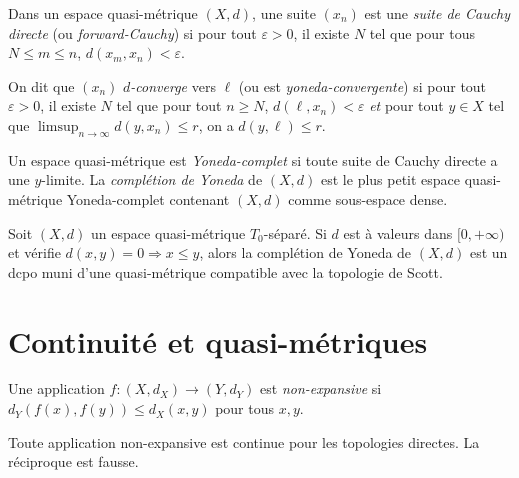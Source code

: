 \begin{definition}
Dans un espace quasi-m\'etrique $(X,d)$, une suite $(x_n)$ est une \emph{suite de Cauchy
directe} (ou \emph{forward-Cauchy}) si pour tout $\varepsilon > 0$, il existe $N$ tel que
pour tous $N \leq m \leq n$, $d(x_m, x_n) < \varepsilon$.
\end{definition}

\begin{definition}[$y$-limite]
On dit que $(x_n)$ \emph{$d$-converge} vers $\ell$ (ou est \emph{yoneda-convergente}) si
pour tout $\varepsilon > 0$, il existe $N$ tel que pour tout $n \geq N$,
$d(\ell, x_n) < \varepsilon$ \emph{et} pour tout $y \in X$ tel que
$\limsup_{n\to\infty} d(y, x_n) \leq r$, on a $d(y, \ell) \leq r$.
\end{definition}

\begin{definition}
Un espace quasi-m\'etrique est \emph{Yoneda-complet} si toute suite de Cauchy directe
a une $y$-limite. La \emph{compl\'etion de Yoneda} de $(X,d)$ est le plus petit espace
quasi-m\'etrique Yoneda-complet contenant $(X,d)$ comme sous-espace dense.
\end{definition}

\begin{theoreme}
Soit $(X,d)$ un espace quasi-m\'etrique $T_0$-s\'epar\'e. Si $d$ est \`a valeurs dans
$[0,+\infty)$ et v\'erifie $d(x,y) = 0 \Rightarrow x \leq y$, alors la compl\'etion de
Yoneda de $(X,d)$ est un dcpo muni d'une quasi-m\'etrique compatible avec la topologie de
Scott.
\end{theoreme}

\section{Continuit\'e et quasi-m\'etriques}

\begin{definition}
Une application $f\colon (X,d_X) \to (Y,d_Y)$ est \emph{non-expansive} si
$d_Y(f(x),f(y)) \leq d_X(x,y)$ pour tous $x,y$.
\end{definition}

\begin{proposition}
Toute application non-expansive est continue pour les topologies directes.
La r\'eciproque est fausse.
\end{proposition}

